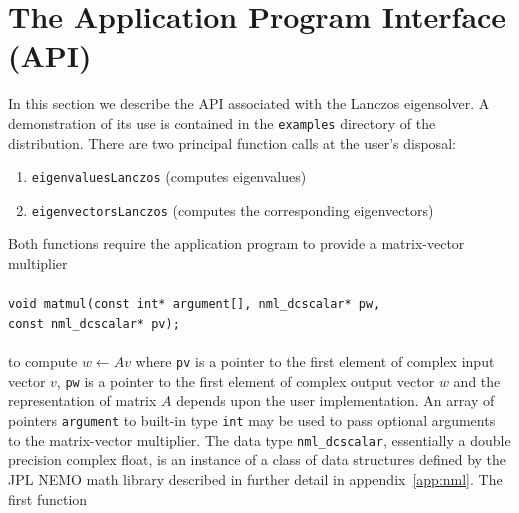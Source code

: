 \documentclass[twoside,12pt]{article}
\begin{document}
\section{The Application Program Interface (API)}\label{sec:api}
In this section we describe the API associated with the Lanczos eigensolver.  
A demonstration of its use is contained in the \verb!examples! directory
of the distribution.
There are two principal function calls at the user's disposal:
\begin{enumerate}
\item	{\tt eigenvaluesLanczos} (computes eigenvalues)
\item	{\tt eigenvectorsLanczos} (computes the corresponding eigenvectors)
\end{enumerate}
Both functions require the application program to provide
a matrix-vector multiplier \\
\\
{\tt void matmul(const~int*~argument[], nml\_dcscalar*~pw, const~nml\_dcscalar*~pv);} \\
\\
to compute $w \leftarrow Av$ where
{\tt pv} is a pointer to the first element of complex  input vector $v$,
{\tt pw} is a pointer to the first element of complex output vector $w$
and the representation of matrix $A$ depends upon the user implementation.
An array of pointers {\tt argument} to built-in type {\tt int}
may be used to pass optional arguments to the matrix-vector multiplier.
The data type {\tt nml\_dcscalar}, essentially a double precision
complex float, is an instance of a class of data structures defined
by the JPL NEMO math library described in further detail in 
appendix~\ref{app:nml}.
The first function
\end{document}
